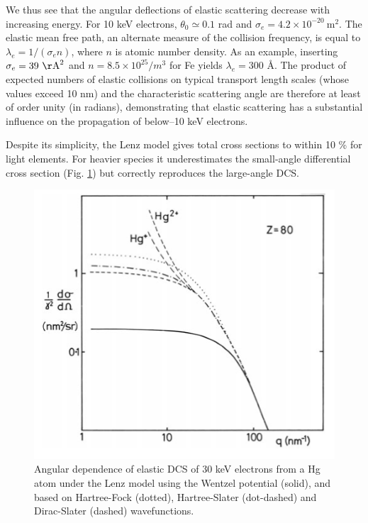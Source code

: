 \documentclass [11pt, proquest, article] {uwthesis}[2016/11/22]
\begin{document}
We thus see that the angular deflections of elastic scattering decrease with increasing energy. For 10 keV electrons, $\theta_0 \simeq 0.1$ rad and $\sigma_e = 4.2 \times 10^{-20}~\mathrm{m}^2$. The elastic mean free path, an alternate measure of the collision frequency, is equal to $\lambda_e = 1/(\sigma_e n)$, where $n$ is atomic number density. As an example, inserting $\sigma_e = 39~\mathrm{\AA}^2$ and $n = 8.5\times 10^{25}/m^3$ for Fe yields $\lambda_e = 300$ \AA. The product of expected numbers of elastic collisions on typical transport length scales (whose values exceed 10 nm) and the characteristic scattering angle are therefore at least of order unity (in radians), demonstrating that elastic scattering has a substantial influence on the propagation of below--10 keV electrons.


Despite its simplicity, the Lenz model gives total cross sections to within 10 \% for light elements.\cite{geiger1964streuung} For heavier species it underestimates the small-angle differential cross section (Fig. \ref{fig:e3.3}) but correctly reproduces the large-angle DCS.

\begin{figure}[h] 
	\caption{Angular dependence of elastic DCS of 30 keV electrons from a Hg atom under the Lenz model using the Wentzel potential (solid), and based on Hartree-Fock (dotted), Hartree-Slater (dot-dashed) and Dirac-Slater (dashed) wavefunctions.  \cite{egerton2011electron} }
	\label{fig:e3.3}
\centering
\includegraphics[scale=0.5]{../Figures/egerton_3_3.png}
\end{figure}
\end{document}
